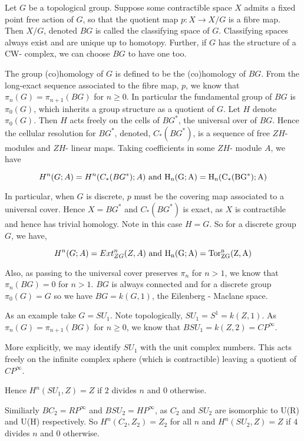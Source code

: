 \documentclass[12pt]{article}
\begin{document}
Let $G$ be a topological group.  Suppose some contractible space $X$ admits a fixed point free action of $G$, so that the quotient map $p:X \rightarrow X/G$ is a fibre map.  Then $X/G$, denoted $BG$ is called the classifying space of $G$.  Classifying spaces always exist and are unique up to homotopy.  Further, if $G$ has the structure of a CW- complex, we can choose $BG$ to have one too.

The group (co)homology of $G$ is defined to be the  (co)homology of $BG$.  From the long-exact sequence associated to the fibre map, $p$, we know that $\pi_{n} (G) = \pi_{n+1}(BG)$ for $n \geq 0$.  In particular the fundamental group of $BG$ is $\pi_0(G)$, which inherits a group structure as a quotient of $G$. Let $H$ denote $\pi_0(G)$.  Then $H$ acts freely on the cells of $BG^{*}$, the universal over of $BG$.  Hence the cellular resolution for $BG^{*}$, denoted, $C_*(BG^{*})$, is a sequence of free $ZH$- modules and $ZH$- linear maps.  Taking coefficients in some $ZH$- module $A$, we have 

$$
H^n(G; A)=H^n(C_{*}(BG^{*}); A) \,\,\rm{ and }\,\, H_n(G; A)=H_n(C_{*}(BG^{*}); A)
$$

In particular, when $G$ is discrete, $p$ must be the covering map associated to a universal cover.  Hence $X=BG^{*}$ and $C_*(BG^{*})$ is exact, as $X$ is contractible and hence has trivial homology.  Note in this case $H=G$.  So for a discrete group $G$, we have, 

$$
H^n(G; A)=Ext^n_{ZG}(Z, A) \,\,\rm{  and  }\,\, H_n(G; A)= Tor^n_{ZG}(Z, A)
$$

Also, as passing to the universal cover preserves $\pi_{n}$ for  $n > 1$, we know that $\pi_n (BG)=0$ for $n > 1$.  $BG$ is always connected and for a discrete group $\pi_0(G)=G$ so we have $BG = k(G,1)$, the Eilenberg - Maclane space.

As an example take $G = SU_1$.  Note topologically, $SU_1=S^1 = k(Z, 1)$.  As $\pi_n (G) = \pi_{n+1}(BG)$ for  $n \geq 0$, we know that $BSU_1= k(Z, 2)= CP^\infty$.

More explicitly, we may identify $SU_1$ with the unit complex numbers.  This acts freely on the infinite complex sphere (which is contractible) leaving a quotient of $CP^\infty$.  

Hence $H^n(SU_1,Z)=Z$ if $2$ divides $n$ and $0$ otherwise.

Similiarly $BC_2= RP^\infty$ and $BSU_2 = HP^\infty$, as $C_2$ and $SU_2$ are isomorphic to U(R) and U(H) respectively.    So $H^n(C_2, Z_2)=Z_2$ for all $n$ and $H^n(SU_2,Z)=Z$ if $4$ divides $n$ and $0$ otherwise.
\end{document}
